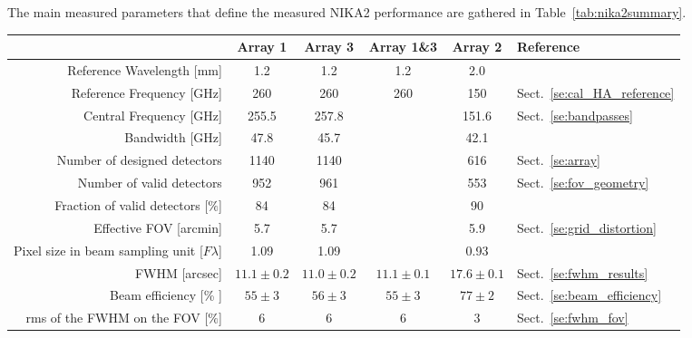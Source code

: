 The main measured parameters that define the measured NIKA2 performance
are gathered in Table~\ref{tab:nika2summary}.

\begin{table}[h]
\begin{center}    
  \begin{threeparttable}
    \begin{tabular}{|r|c|c|c|c|l|}
      \hline
      & Array 1 & Array 3  & Array 1\&3 & Array 2 & Reference \\
      \hline
      \hline
      Reference Wavelength  [mm]  &  1.2    &  1.2   & 1.2  & 2.0   &   \\
      Reference Frequency  [GHz]  &  260    &  260   & 260  & 150   &  Sect.~\ref{se:cal_HA_reference}  \\
      Central Frequency [GHz]     &  255.5  &  257.8 &      & 151.6 &  Sect.~\ref{se:bandpasses}  \\
      Bandwidth         [GHz]     &  47.8   &  45.7  &      & 42.1  &   \\
      \hline
      Number of designed detectors                   & 1140      &  1140    &    &    616  & Sect.~\ref{se:array}\\
      Number of valid detectors                      &  952      &   961    &    &    553  & Sect.~\ref{se:fov_geometry}\\
      Fraction of valid detectors [$\%$]             &  84       &   84     &    &     90  & \\
      Effective FOV\tnote{a}\hspace{1mm} [arcmin]    &  5.7      &   5.7    &    &    5.9  & Sect.~\ref{se:grid_distortion}\\
      Pixel size in beam sampling unit\tnote{b}\hspace{1mm} [$F\lambda$] & 1.09 & 1.09  &  &  0.93 & \\
      \hline
      FWHM\tnote{c}\hspace{1mm} [arcsec]    &  $11.1 \pm 0.2$   &  $11.0 \pm 0.2$  &   $11.1 \pm 0.1$  &  $17.6 \pm 0.1$  &  Sect.~\ref{se:fwhm_results}\\
      Beam efficiency\tnote{d}\hspace{1mm} [\% ] &  $55 \pm 3$  &  $56 \pm 3$   &  $55 \pm 3$   &  $77 \pm 2$  &  Sect.~\ref{se:beam_efficiency}\\
      rms of the FWHM on the FOV [$\%$]          &    6         &      6        &       6        &      3        & Sect.~\ref{se:fwhm_fov}\\
      \hline

\end{tabular}
\end{threeparttable}
\end{center}
\end{table}
